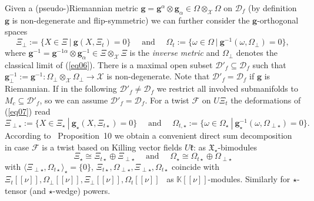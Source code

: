\documentclass[a4paper,11pt]{article}
\begin{document}
Given a (pseudo-)Riemannian metric $\mathbf{g}=\mathbf{g}^\alpha\otimes\mathbf{g}_\alpha
\in\Omega\otimes_\mathcal{X}\Omega$ on $\mathcal{D}_f$ (by definition  $\mathbf{g}$ is non-degenerate and flip-symmetric) we can further consider
the $\mathbf{g}$-orthogonal spaces
\begin{equation}\label{eq07}
    \Xi_\perp:=\{X\in\Xi~|~\mathbf{g}(X,\Xi_t)=0\}\quad
    \text{ and }\quad
    \Omega_t:=\{\omega\in\Omega~|~\mathbf{g}^{-1}(\omega,\Omega_\perp)=0\},
\end{equation}
where $\mathbf{g}^{-1}=\mathbf{g}^{-1\alpha}\otimes\mathbf{g}^{-1}_\alpha
\in\Xi\otimes_\mathcal{X}\Xi$ is the \textit{inverse metric} and 
$\Omega_\perp$ denotes the classical limit of (\ref{eq06}).
There is a maximal open subset $\mathcal{D}'_f\subseteq\mathcal{D}_f$ such that
$\mathbf{g}_\perp^{-1}:=\mathbf{g}^{-1}\colon
\Omega_\perp\otimes_\mathcal{X}\Omega_\perp\rightarrow\mathcal{X}$ is non-degenerate.
Note that $\mathcal{D}'_f=\mathcal{D}_f$ if $\mathbf{g}$ is Riemannian. If 
in the following $\mathcal{D}'_f\neq\mathcal{D}_f$ we restrict all involved submanifolds
to $M_c\subseteq\mathcal{D}'_f$, so we can assume $\mathcal{D}'_f=\mathcal{D}_f$.
For a twist $\mathcal{F}$ on $U\Xi_t$ the deformations of (\ref{eq07}) read
\begin{equation}
    \Xi_{\perp\star}:=\{X\in\Xi_\star~|~\mathbf{g}_\star(X,\Xi_{t\star})=0\}\quad
    \text{ and }\quad
    \Omega_{t,\star}:=\{\omega\in\Omega_\star~|~\mathbf{g}_\star^{-1}
    (\omega,\Omega_{\perp\star})=0\}.
\end{equation}
According to \cite{FioreWeber}~Proposition~10 we obtain a convenient direct sum 
decomposition in case $\mathcal{F}$ is a twist based on Killing vector fields
$U\mathfrak{k}$: as $\mathfrak{X}_\star$-bimodules
\begin{equation}\label{eq08}
    \Xi_\star\cong\Xi_{t\star}\oplus\Xi_{\perp\star}\quad
    \text{ and }\quad
    \Omega_\star\cong\Omega_{t\star}\oplus\Omega_{\perp\star}
\end{equation}
with $\langle \Xi_{{\scriptscriptstyle{\perp}}\star},\Omega_{t\star}\rangle_\star\!=\!\{0\}$, 
$\Xi_{t\star},\Omega_{{\scriptscriptstyle{\perp}}\star},\Xi_{{\scriptscriptstyle{\perp}}\star},\Omega_{t\star}$
 coincide  with  $\Xi_t[[\nu]],\Omega_{\perp}[[\nu]],\Xi_{\perp}[[\nu]],\Omega_t[[\nu]]$ \ as $\mathbb{K}[[\nu]]$-modules. Similarly for $\star$-tensor (and $\star$-wedge) powers.
\end{document}
